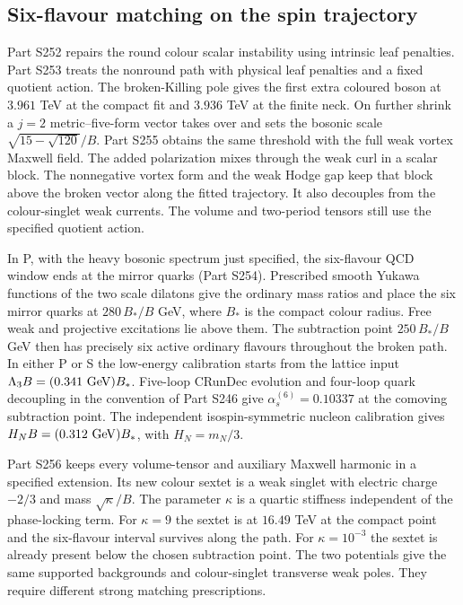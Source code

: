 \documentclass[aps,prd,reprint,onecolumn,nofootinbib,amsmath,amssymb]{revtex4-2}
\begin{document}
\subsection{Six-flavour matching on the spin trajectory}

Part S252 repairs the round colour scalar instability using intrinsic leaf penalties. Part S253 treats the nonround path with physical leaf penalties and a fixed quotient action. The broken-Killing pole gives the first extra coloured boson at $3.961$ TeV at the compact fit and $3.936$ TeV at the finite neck. On further shrink a $j=2$ metric--five-form vector takes over and sets the bosonic scale $\sqrt{15-\sqrt{120}}/B$. Part S255 obtains the same threshold with the full weak vortex Maxwell field. The added polarization mixes through the weak curl in a scalar block. The nonnegative vortex form and the weak Hodge gap keep that block above the broken vector along the fitted trajectory. It also decouples from the colour-singlet weak currents. The volume and two-period tensors still use the specified quotient action.

In P, with the heavy bosonic spectrum just specified, the six-flavour QCD window ends at the mirror quarks (Part S254). Prescribed smooth Yukawa functions of the two scale dilatons give the ordinary mass ratios and place the six mirror quarks at $280\,B_*/B$ GeV, where $B_*$ is the compact colour radius. Free weak and projective excitations lie above them. The subtraction point $250\,B_*/B$ GeV then has precisely six active ordinary flavours throughout the broken path. In either P or S the low-energy calibration starts from the lattice input $\Lambda_3 B=(0.341\ {\rm GeV})B_*$. Five-loop CRunDec evolution and four-loop quark decoupling in the convention of Part S246 give $\alpha_s^{(6)}=0.10337$ at the comoving subtraction point. The independent isospin-symmetric nucleon calibration gives $H_N B=(0.312\ {\rm GeV})B_*$, with $H_N=m_N/3$.

Part S256 keeps every volume-tensor and auxiliary Maxwell harmonic in a specified extension. Its new colour sextet is a weak singlet with electric charge $-2/3$ and mass $\sqrt\kappa/B$. The parameter $\kappa$ is a quartic stiffness independent of the phase-locking term. For $\kappa=9$ the sextet is at $16.49$ TeV at the compact point and the six-flavour interval survives along the path. For $\kappa=10^{-3}$ the sextet is already present below the chosen subtraction point. The two potentials give the same supported backgrounds and colour-singlet transverse weak poles. They require different strong matching prescriptions.
\end{document}
